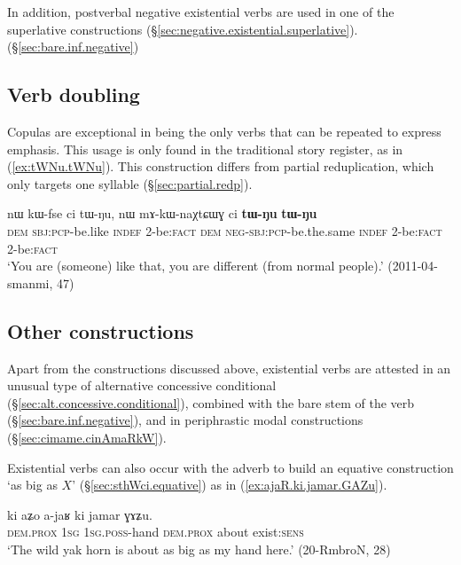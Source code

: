 In addition, postverbal negative existential verbs are used in one of the superlative constructions (§\ref{sec:negative.existential.superlative}).
(§\ref{sec:bare.inf.negative})

\subsection{Verb doubling} \label{sec:verb.doubling}
Copulas are exceptional in being the only verbs that can be repeated to express emphasis. This usage is only found in the traditional story register, as in (\ref{ex:tWNu.tWNu}). This construction differs from partial reduplication, which only targets one syllable (§\ref{sec:partial.redp}).

\begin{exe}
\ex \label{ex:tWNu.tWNu}
\gll nɯ kɯ-fse ci tɯ-ŋu, nɯ mɤ-kɯ-naχtɕɯɣ ci \textbf{tɯ-ŋu} \textbf{tɯ-ŋu} \\
\textsc{dem} \textsc{sbj}:\textsc{pcp}-be.like \textsc{indef} 2-be:\textsc{fact} \textsc{dem} \textsc{neg}-\textsc{sbj}:\textsc{pcp}-be.the.same \textsc{indef} 2-be:\textsc{fact} 2-be:\textsc{fact} \\
\glt `You are (someone) like that, you are different (from normal people).' (2011-04-smanmi, 47)
\end{exe}



\subsection{Other constructions}
Apart from the constructions discussed above, existential verbs are attested in an unusual type of alternative concessive conditional (§\ref{sec:alt.concessive.conditional}), combined with the bare stem of the verb (§\ref{sec:bare.inf.negative}), and in periphrastic modal constructions (§\ref{sec:cimame.cinAmaRkW}).
 
 Existential verbs can also occur with the adverb  to build an equative construction `as big as $X$' (§\ref{sec:sthWci.equative}) as in (\ref{ex:ajaR.ki.jamar.GAZu}).  

\begin{exe}
\ex \label{ex:ajaR.ki.jamar.GAZu}
\gll ki aʑo a-jaʁ ki jamar ɣɤʑu. \\
\textsc{dem}.\textsc{prox} \textsc{1sg} \textsc{1sg}.\textsc{poss}-hand \textsc{dem}.\textsc{prox} about exist:\textsc{sens} \\
\glt `The wild yak horn is about as big as my hand here.' (20-RmbroN, 28)
 \end{exe}


